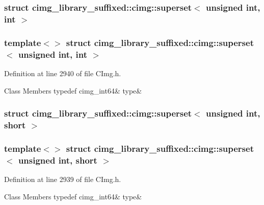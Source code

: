 \subsubsection{struct cimg\+\_\+library\+\_\+suffixed\+:\+:cimg\+:\+:superset$<$ unsigned int, int $>$}
\subsubsection*{template$<$$>$\newline
struct cimg\+\_\+library\+\_\+suffixed\+::cimg\+::superset$<$ unsigned int, int $>$}



Definition at line 2940 of file C\+Img.\+h.

\begin{DoxyFields}{Class Members}
\mbox{\label{namespacecimg__library__suffixed_1_1cimg_a4562c14a4a213b1d1bc2e6e8a4f5c3f8}} 
typedef cimg\_int64&
type&
\\
\hline

\end{DoxyFields}
\label{structcimg__library__suffixed_1_1cimg_1_1superset_3_01unsigned_01int_00_01short_01_4}
\subsubsection{struct cimg\+\_\+library\+\_\+suffixed\+:\+:cimg\+:\+:superset$<$ unsigned int, short $>$}
\subsubsection*{template$<$$>$\newline
struct cimg\+\_\+library\+\_\+suffixed\+::cimg\+::superset$<$ unsigned int, short $>$}



Definition at line 2939 of file C\+Img.\+h.

\begin{DoxyFields}{Class Members}
\mbox{\label{namespacecimg__library__suffixed_1_1cimg_acf99769488a811c4e6551606bd9431fc}} 
typedef cimg\_int64&
type&
\\
\hline

\end{DoxyFields}
\label{structcimg__library__suffixed_1_1cimg_1_1superset_3_01unsigned_01int_00_01signed_01char_01_4}
